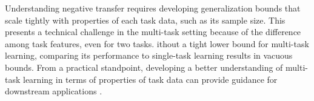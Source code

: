Understanding negative transfer requires developing generalization bounds that scale tightly with properties of each task data, such as its sample size.
This presents a technical challenge in the multi-task setting because of the difference among task features, even for two tasks.
ithout a tight lower bound for multi-task learning, comparing its performance to single-task learning results in vacuous bounds.
From a practical standpoint, developing a better understanding of multi-task learning in terms of properties of task data can provide guidance for downstream applications \cite{RH19}.


